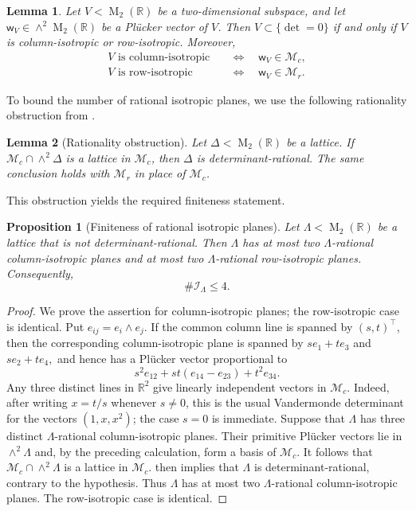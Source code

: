 \documentclass[reqno,11pt]{amsart}
\newtheorem{prop}[prop]{Proposition}
\newtheorem{lem}[lem]{Lemma}
\theoremstyle{definition}
\theoremstyle{remark}
\numberwithin{equation}{section}
\newcommand{\M}{\operatorname{M}}
\begin{document}
\begin{lem}\label{lem:isotropic-plucker-d2}
Let $V<\M_2(\mathbb R)$ be a two-dimensional subspace, and let
$\mathsf w_V\in\wedge^2\M_2(\mathbb R)$ be a Pl\"ucker vector of $V$.
Then $V\subset\{\det=0\}$ if and only if $V$ is column-isotropic or
row-isotropic. Moreover,
$$
\begin{aligned}
V\text{ is column-isotropic}
&\quad\Longleftrightarrow\quad
\mathsf w_V\in\mathcal M_c,\\
V\text{ is row-isotropic}
&\quad\Longleftrightarrow\quad
\mathsf w_V\in\mathcal M_r.
\end{aligned}
$$
\end{lem}


To bound the number of rational isotropic planes, we use the following
rationality obstruction from \cite[Proposition~3.3]{KimOh_det}.

\begin{lem}[Rationality obstruction]
\label{lem:rational-ruling-d2}
Let $\Delta<\M_2(\mathbb R)$ be a lattice. If
$\mathcal M_c\cap\wedge^2\Delta$ is a lattice in $\mathcal M_c$, then
$\Delta$ is determinant-rational. The same conclusion holds with
$\mathcal M_r$ in place of $\mathcal M_c$.
\end{lem}

This obstruction yields the required finiteness statement.

\begin{prop}[Finiteness of rational isotropic planes]
\label{prop:finite-isotropic-planes-d2}
Let $\Lambda<\M_2(\mathbb R)$ be a lattice that is not
determinant-rational. Then $\Lambda$ has at most two
$\Lambda$-rational column-isotropic planes and at most two
$\Lambda$-rational row-isotropic planes. Consequently,
$$
\#\mathcal I_\Lambda\le4.
$$
\end{prop}


\begin{proof}
We prove the assertion for column-isotropic planes; the row-isotropic case
is identical. Put $e_{ij}=e_i\wedge e_j$. If the common column line is
spanned by $(s,t)^{\intercal}$, then the corresponding column-isotropic
plane is spanned by
$
se_1+te_3$ and $se_2+te_4,
$
and hence has a Pl\"ucker vector proportional to
$$
s^2e_{12}+st(e_{14}-e_{23})+t^2e_{34}.
$$
Any three distinct lines in $\mathbb R^2$ give
linearly independent vectors in $\mathcal M_c$. Indeed, after writing
$x=t/s$ whenever $s\ne0$, this is the usual Vandermonde determinant for
the vectors $(1,x,x^2)$; the case $s=0$ is immediate.
Suppose that $\Lambda$ has three distinct $\Lambda$-rational
column-isotropic planes. Their primitive Pl\"ucker vectors lie in
$\wedge^2\Lambda$ and, by the preceding calculation, form a basis of
$\mathcal M_c$. It follows that
$\mathcal M_c\cap\wedge^2\Lambda$ is a lattice in $\mathcal M_c$.
 then implies that $\Lambda$ is
determinant-rational, contrary to the hypothesis. Thus $\Lambda$ has at
most two $\Lambda$-rational column-isotropic planes. The row-isotropic
case is identical.
\end{proof}
\end{document}
